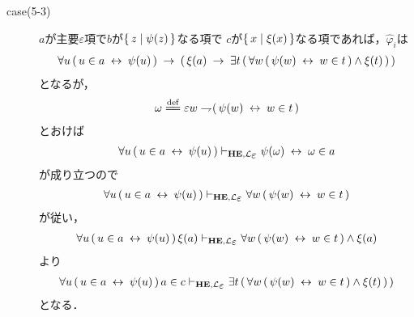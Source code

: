 \begin{metaprf}
\begin{description}
\begin{description}
					\item[case(5-3)] $a$が主要$\varepsilon$項で$b$が$\{\, z \mid \psi(z)\, \}$なる項で
						$c$が$\{\, x \mid \xi(x)\, \}$なる項であれば，$\widehat{\varphi}_{i}$は
						\begin{align}
							\forall u\, (\, u \in a \hspace{0.25em}\leftrightarrow\hspace{0.25em} \psi(u)\, ) 
							\hspace{0.25em}\rightarrow\hspace{0.25em} (\, \xi(a) 
							\hspace{0.25em}\rightarrow\hspace{0.25em} \exists t\, (\, \forall w\, (\, \psi(w) \hspace{0.25em}\leftrightarrow\hspace{0.25em} w \in t\, ) \wedge \xi(t)\, )\, )
						\end{align}
						となるが，
						\begin{align}
							\omega \defeq \varepsilon w \negation (\, \psi(w) \lrarrow w \in t\, )
						\end{align}
						とおけば
						\begin{align}
							\forall u\, (\, u \in a \lrarrow \psi(u)\, )
							\provable{\mbox{{\bf HE}},\lang{\varepsilon}} \psi(\omega) \lrarrow \omega \in a 
						\end{align}
						が成り立つので
						\begin{align}
							\forall u\, (\, u \in a \lrarrow \psi(u)\, )
							\provable{\mbox{{\bf HE}},\lang{\varepsilon}} \forall w\, (\, \psi(w) \lrarrow w \in t\, )
						\end{align}
						が従い，
						\begin{align}
							\forall u\, (\, u \in a \lrarrow \psi(u)\, )\, \xi(a)
							\provable{\mbox{{\bf HE}},\lang{\varepsilon}} \forall w\, (\, \psi(w) \lrarrow w \in t\, ) \wedge \xi(a)
						\end{align}
						より
						\begin{align}
							\forall u\, (\, u \in a \lrarrow \psi(u)\, )\, a \in c
							\provable{\mbox{{\bf HE}},\lang{\varepsilon}} \exists t\, (\, \forall w\, (\, \psi(w) \lrarrow w \in t\, ) \wedge \xi(t)\, )\, )
						\end{align}
						となる．
						

\end{description}
\end{description}
\end{metaprf}
